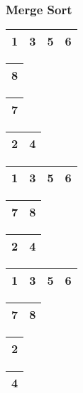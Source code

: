 
\begin{frame}
\frametitle{Merge Sort}
\begin{table}
\begin{tabular}{| c | c | c | c |}
\hline
1 & 3 & 5 & 6 \\ 
\hline
\end{tabular}
\quad
\begin{tabular}{| c |}
\hline
\cellcolor{blue!25}8 \\ 
\hline
\end{tabular}
\quad
\begin{tabular}{| c |}
\hline
\cellcolor{blue!25}7 \\ 
\hline
\end{tabular}
\quad
\begin{tabular}{| c | c |}
\hline
2 & 4 \\ 
\hline
\end{tabular}
\end{table}

\begin{table}
\begin{tabular}{| c | c | c | c |}
\hline
1 & 3 & 5 & 6 \\ 
\hline
\end{tabular}
\quad
\begin{tabular}{| c | c |}
\hline
\cellcolor{blue!25}7 & \cellcolor{blue!25}8 \\ 
\hline
\end{tabular}
\quad
\begin{tabular}{| c | c |}
\hline
2 & 4 \\ 
\hline
\end{tabular}
\end{table}

\begin{table}
\begin{tabular}{| c | c | c | c |}
\hline
1 & 3 & 5 & 6 \\ 
\hline
\end{tabular}
\quad
\begin{tabular}{| c | c |}
\hline
7 & 8 \\ 
\hline
\end{tabular}
\quad
\begin{tabular}{| c |}
\hline
\cellcolor{blue!25}2 \\ 
\hline
\end{tabular}
\quad
\begin{tabular}{| c |}
\hline
\cellcolor{blue!25}4 \\ 
\hline
\end{tabular}
\end{table}


\end{frame}
